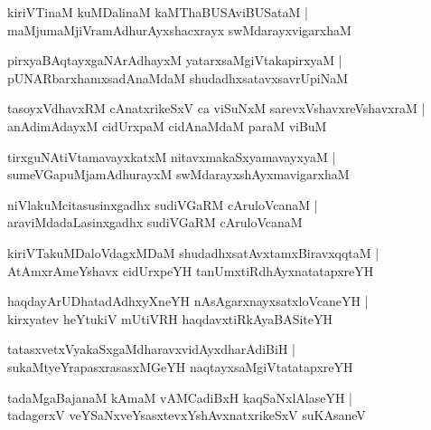 \documentclass[twoside,12pt,openright]{book}
\newcounter{shloka}[chapter]
\begin{document}
\begin{shloka}%
kiriVTinaM kuMDalinaM kaMThaBUSAviBUSataM |\\
maMjumaMjiVramAdhurAyxshacxrayx swMdarayxvigarxhaM 
\end{shloka}

\begin{shloka}%
pirxyaBAqtayxgaNArAdhayxM yatarxsaMgiVtakapirxyaM |\\
pUNARbarxhamxsadAnaMdaM shudadhxsatavxsavrUpiNaM 
\end{shloka}

\begin{shloka}%
tasoyxVdhavxRM cAnatxrikeSxV ca viSuNxM sarevxVshavxreVshavxraM |\\
anAdimAdayxM cidUrxpaM cidAnaMdaM paraM viBuM 
\end{shloka}

\begin{shloka}%
tirxguNAtiVtamavayxkatxM nitavxmakaSxyamavayxyaM |\\
sumeVGapuMjamAdhurayxM swMdarayxshAyxmavigarxhaM 
\end{shloka}

\begin{shloka}%
niVlakuMcitasusinxgadhx sudiVGaRM cAruloVcanaM |\\
araviMdadaLasinxgadhx sudiVGaRM cAruloVcanaM 
\end{shloka}

\begin{shloka}%
kiriVTakuMDaloVdagxMDaM shudadhxsatAvxtamxBiravxqqtaM |\\
AtAmxrAmeYshavx cidUrxpeYH tanUmxtiRdhAyxnatatapxreYH 
\end{shloka}

\begin{shloka}%
haqdayArUDhatadAdhxyXneYH nAsAgarxnayxsatxloVcaneYH |\\
kirxyatev heYtukiV mUtiVRH haqdavxtiRkAyaBASiteYH
\end{shloka}

\begin{shloka}%
tatasxvetxVyakaSxgaMdharavxvidAyxdharAdiBiH |\\
sukaMtyeYrapasxrasasxMGeYH naqtayxsaMgiVtatatapxreYH
\end{shloka}

\begin{shloka}%
tadaMgaBajanaM kAmaM vAMCadiBxH kaqSaNxlAlaseYH |\\
tadagerxV veYSaNxveYsasxtevxYshAvxnatxrikeSxV suKAsaneV
\end{shloka}
\end{document}
